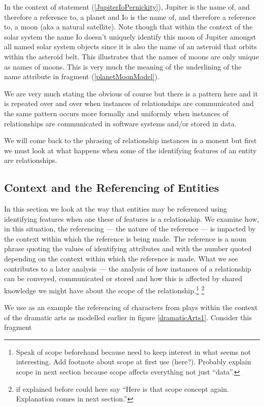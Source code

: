 In the context of statement (\ref{JupiterIoPernickity}), Jupiter is the name of, and therefore  a reference to, a planet and  Io is the name of, and therefore a reference to, a moon (aka a natural satellite).
Note though that within the context of the solar system the name Io  doesn't uniquely identify this moon of Jupiter amongst all named solar system objects since it is also the name of an asteroid that orbits within the asteroid belt. This  illustrates that 
the names of moons are only unique as names of moons. This is very much the meaning of the underlining of the name attribute in fragment (\ref{planetMoonModel}). 

\mynote
We are very much stating the obvious of course but there is a pattern here and it is repeated over and over when instances of relationships are communicated  and the same pattern occurs more formally  and uniformly when instances of relationships are communicated in software systems and/or stored in data.

We will come back to the phrasing of relationship instances in a monent but first we must look at what happens when some of the identifying features of an entity are relationships.

\subsection{Context and the Referencing of Entities}
\mynote
In this section we look at the way that entities may be referenced using identifying features
 when one these of features is a relationship.
We examine how,  in this situation, the referencing 
--- the nature of the reference ---   
is impacted by the context within which the reference is being made. 
The reference is  a noun phrase quoting the values of identifying attributes
and with the number quoted depending on 
the context within which the reference is made.
What we see contributes to a later analysis --- the analysis of  how 
instances of a relationship can be conveyed, communicated or stored and
how this is affected by shared knowledge we might have about 
the scope of  the relationship.\footnote{Speak of scope beforehand because need to keep interest in what seems not interesting. Add footnote about scope at first use (here?). Probably explain scope in next section because scope affects everything not just ``data''.} \footnote{if explained before could here say ``Here is that scope concept again. Explanation comes in next section.''}

\mynote
 We use as an example the referencing of characters from  plays
 within the context of  the  dramatic arts
   as modelled earlier in figure \ref{dramaticArts1}.
\mynote
Consider this fragment 

